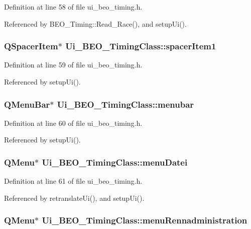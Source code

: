Definition at line 58 of file ui\_\-beo\_\-timing.h.

Referenced by BEO\_\-Timing::Read\_\-Race(), and setupUi().\hypertarget{class_ui___b_e_o___timing_class_dabf0adcf4e192d0d124daa4c9747cf1}{
\subsubsection[spacerItem1]{\setlength{\rightskip}{0pt plus 5cm}QSpacerItem$\ast$ {\bf Ui\_\-BEO\_\-TimingClass::spacerItem1}}}
\label{class_ui___b_e_o___timing_class_dabf0adcf4e192d0d124daa4c9747cf1}




Definition at line 59 of file ui\_\-beo\_\-timing.h.

Referenced by setupUi().\hypertarget{class_ui___b_e_o___timing_class_429e6665cc4bbdb800fa60091a1df117}{
\subsubsection[menubar]{\setlength{\rightskip}{0pt plus 5cm}QMenuBar$\ast$ {\bf Ui\_\-BEO\_\-TimingClass::menubar}}}
\label{class_ui___b_e_o___timing_class_429e6665cc4bbdb800fa60091a1df117}




Definition at line 60 of file ui\_\-beo\_\-timing.h.

Referenced by setupUi().\hypertarget{class_ui___b_e_o___timing_class_a0576d6c6301fad2fd447ff0cb972232}{
\subsubsection[menuDatei]{\setlength{\rightskip}{0pt plus 5cm}QMenu$\ast$ {\bf Ui\_\-BEO\_\-TimingClass::menuDatei}}}
\label{class_ui___b_e_o___timing_class_a0576d6c6301fad2fd447ff0cb972232}




Definition at line 61 of file ui\_\-beo\_\-timing.h.

Referenced by retranslateUi(), and setupUi().\hypertarget{class_ui___b_e_o___timing_class_1b938bf6e75705f59c6e99dc594e6972}{
\subsubsection[menuRennadministration]{\setlength{\rightskip}{0pt plus 5cm}QMenu$\ast$ {\bf Ui\_\-BEO\_\-TimingClass::menuRennadministration}}}
\label{class_ui___b_e_o___timing_class_1b938bf6e75705f59c6e99dc594e6972}





